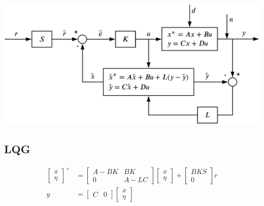 \centerline{\includegraphics[width=1\linewidth]{src/5_dynamic_output_feedback/images/dofb.png}}

\subsection{LQG}
\begin{align*}
    \begin{bmatrix}
        x \\
        \eta
    \end{bmatrix}^+
    &= \begin{bmatrix}
        A - BK & BK \\
        0 & A - LC
    \end{bmatrix}
    \begin{bmatrix}
        x \\
        \eta
    \end{bmatrix} +
    \begin{bmatrix}
        BKS\\
        0
    \end{bmatrix} r\\
    y &= \begin{bmatrix} C & 0 \end{bmatrix}
    \begin{bmatrix}
        x \\
        \eta
    \end{bmatrix}
\end{align*}

